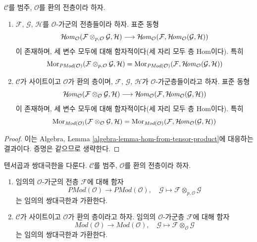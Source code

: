 \begin{lemma}
\label{lemma-internal-hom-adjoint-tensor}
$\mathcal{C}$를 범주, $\mathcal{O}$를 환의 전층이라 하자.
\begin{enumerate}
\item $\mathcal{F}$, $\mathcal{G}$, $\mathcal{H}$를 $\mathcal{O}$-가군의
전층들이라 하자. 표준 동형
$$
\mathop{\mathcal{H}\!\mathit{om}}\nolimits_\mathcal{O}
(\mathcal{F} \otimes_{p, \mathcal{O}} \mathcal{G}, \mathcal{H})
\longrightarrow
\mathop{\mathcal{H}\!\mathit{om}}\nolimits_\mathcal{O}
(\mathcal{F}, \mathop{\mathcal{H}\!\mathit{om}}\nolimits_\mathcal{O}(\mathcal{G}, \mathcal{H}))
$$
이 존재하며, 세 변수 모두에 대해 함자적이다(세 자리 모두 층 Hom이다).
특히
$$
\mathop{\mathrm{Mor}}\nolimits_{\textit{PMod}(\mathcal{O})}(
\mathcal{F} \otimes_{p, \mathcal{O}} \mathcal{G}, \mathcal{H})
=
\mathop{\mathrm{Mor}}\nolimits_{\textit{PMod}(\mathcal{O})}(
\mathcal{F}, \mathop{\mathcal{H}\!\mathit{om}}\nolimits_\mathcal{O}(\mathcal{G}, \mathcal{H}))
$$
\item
$\mathcal{C}$가 사이트이고 $\mathcal{O}$가 환의 층이며,
$\mathcal{F}$, $\mathcal{G}$, $\mathcal{H}$가 $\mathcal{O}$-가군층들이라고
하자. 표준 동형
$$
\mathop{\mathcal{H}\!\mathit{om}}\nolimits_\mathcal{O}
(\mathcal{F} \otimes_\mathcal{O} \mathcal{G}, \mathcal{H})
\longrightarrow
\mathop{\mathcal{H}\!\mathit{om}}\nolimits_\mathcal{O}
(\mathcal{F}, \mathop{\mathcal{H}\!\mathit{om}}\nolimits_\mathcal{O}(\mathcal{G}, \mathcal{H}))
$$
이 존재하며, 세 변수 모두에 대해 함자적이다(세 자리 모두 층 Hom이다).
특히
$$
\mathop{\mathrm{Mor}}\nolimits_{\textit{Mod}(\mathcal{O})}(
\mathcal{F} \otimes_\mathcal{O} \mathcal{G}, \mathcal{H})
=
\mathop{\mathrm{Mor}}\nolimits_{\textit{Mod}(\mathcal{O})}(
\mathcal{F}, \mathop{\mathcal{H}\!\mathit{om}}\nolimits_\mathcal{O}(\mathcal{G}, \mathcal{H}))
$$
\end{enumerate}
\end{lemma}

\begin{proof}
이는 Algebra, Lemma \ref{algebra-lemma-hom-from-tensor-product}에 대응하는
결과이다. 증명은 같으므로 생략한다.
\end{proof}

\begin{lemma}
\label{lemma-tensor-commute-colimits}
텐서곱과 쌍대극한을 다룬다. $\mathcal{C}$를 범주,
$\mathcal{O}$를 환의 전층이라 하자.
\begin{enumerate}
\item 임의의 $\mathcal{O}$-가군의 전층 $\mathcal{F}$에 대해 함자
$$
\textit{PMod}(\mathcal{O}) \longrightarrow \textit{PMod}(\mathcal{O})
, \quad
\mathcal{G} \longmapsto \mathcal{F} \otimes_{p, \mathcal{O}} \mathcal{G}
$$
는 임의의 쌍대극한과 가환한다.
\item
$\mathcal{C}$가 사이트이고 $\mathcal{O}$가 환의 층이라고 하자. 임의의
$\mathcal{O}$-가군층 $\mathcal{F}$에 대해 함자
$$
\textit{Mod}(\mathcal{O}) \longrightarrow \textit{Mod}(\mathcal{O})
, \quad
\mathcal{G} \longmapsto \mathcal{F} \otimes_\mathcal{O} \mathcal{G}
$$
는 임의의 쌍대극한과 가환한다.
\end{enumerate}
\end{lemma}

